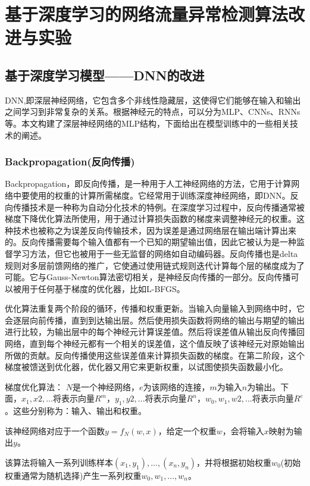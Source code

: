 
\chapter{基于深度学习的网络流量异常检测算法改进与实验}

\section{基于深度学习模型——DNN的改进}
DNN,即深层神经网络，它包含多个非线性隐藏层，这使得它们能够在输入和输出之间学习到非常复杂的关系。根据神经元的特点，可以分为MLP、CNNs、RNNs等。本文构建了深层神经网络的MLP结构，下面给出在模型训练中的一些相关技术的阐述。

\subsection{Backpropagation(反向传播)}

Backpropagation，即反向传播，是一种用于人工神经网络的方法，它用于计算网络中要使用的权重的计算所需梯度。它经常用于训练深度神经网络，即DNN。反向传播技术是一种称为自动分化技术的特例。在深度学习过程中，反向传播通常被梯度下降优化算法所使用，用于通过计算损失函数的梯度来调整神经元的权重。这种技术也被称之为误差反向传输技术，因为误差是通过网络层在输出端计算出来的。反向传播需要每个输入值都有一个已知的期望输出值，因此它被认为是一种监督学习方法，但它也被用于一些无监督的网络如自动编码器。反向传播也是delta规则对多层前馈网络的推广，它使通过使用链式规则迭代计算每个层的梯度成为了可能。它与Gauss-Newton算法密切相关，是神经反向传播的一部分。反向传播可以被用于任何基于梯度的优化器，比如L-BFGS。

优化算法重复两个阶段的循环，传播和权重更新。当输入向量输入到网络中时，它会逐层向前传播，直到到达输出层。然后使用损失函数将网络的输出与期望的输出进行比较，为输出层中的每个神经元计算误差值。然后将误差值从输出反向传播回网络，直到每个神经元都有一个相关的误差值，这个值反映了该神经元对原始输出所做的贡献。反向传播使用这些误差值来计算损失函数的梯度。在第二阶段，这个梯度被馈送到优化器，优化器又用它来更新权重，以试图使损失函数最小化。

梯度优化算法：
$N$是一个神经网络，$e$为该网络的连接，$m$为输入$n$为输出。下面，$x_1,x2,...$将表示向量$R^m$，$y_1,y2,...$将表示向量$R^n$，$w_0,w_1,w2,...$将表示向量$R^e$。这些分别称为：输入、输出和权重。

该神经网络对应于一个函数$y = f_N(w,x)$，给定一个权重$w$，会将输入$x$映射为输出$y$。

该算法将输入一系列训练样本$(x_1,y_1),...,(x_n,y_n)$，并将根据初始权重$w_0$(初始权重通常为随机选择)产生一系列权重$w_0,w_1,...,w_n$。

